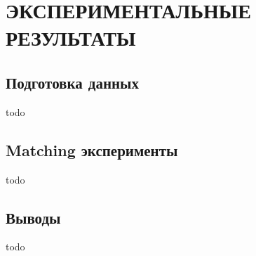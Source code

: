 \chapter{ЭКСПЕРИМЕНТАЛЬНЫЕ РЕЗУЛЬТАТЫ}

\section{Подготовка данных}
todo

\section{Matching эксперименты}
todo

\section{Выводы}
todo

\newpage